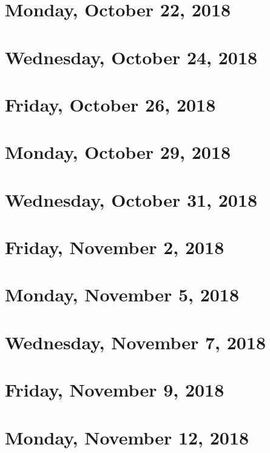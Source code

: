 \documentclass[reqno]{amsart}
\begin{document}
\section{Monday, October 22, 2018}
    
    
\section{Wednesday, October 24, 2018}
    

\section{Friday, October 26, 2018}
    

\section{Monday, October 29, 2018}
    
    
\section{Wednesday, October 31, 2018}
    

\section{Friday, November 2, 2018}
    

\section{Monday, November 5, 2018}
    
    
\section{Wednesday, November 7, 2018}
    

\section{Friday, November 9, 2018}
    
    
\section{Monday, November 12, 2018}
    
    
\end{document}
